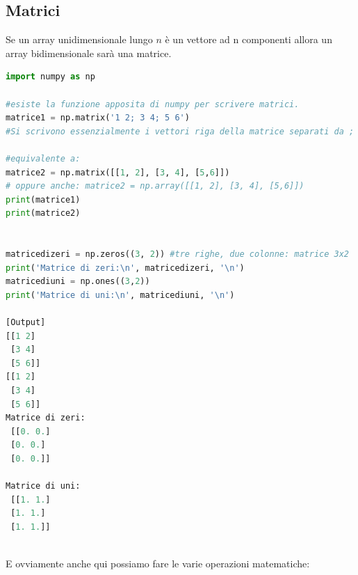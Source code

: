 \documentclass[10pt,a4paper]{article}
\begin{document}
\subsection{Matrici}
Se un array unidimensionale lungo $n$ è un vettore ad n componenti allora un array bidimensionale sarà una matrice.


\begin{lstlisting}[language=Python]
import numpy as np

#esiste la funzione apposita di numpy per scrivere matrici. 
matrice1 = np.matrix('1 2; 3 4; 5 6')   
#Si scrivono essenzialmente i vettori riga della matrice separati da ;

#equivalente a:
matrice2 = np.matrix([[1, 2], [3, 4], [5,6]])
# oppure anche: matrice2 = np.array([[1, 2], [3, 4], [5,6]])
print(matrice1)
print(matrice2)


matricedizeri = np.zeros((3, 2)) #tre righe, due colonne: matrice 3x2
print('Matrice di zeri:\n', matricedizeri, '\n')
matricediuni = np.ones((3,2))
print('Matrice di uni:\n', matricediuni, '\n')

[Output]
[[1 2]
 [3 4]
 [5 6]]
[[1 2]
 [3 4]
 [5 6]]
Matrice di zeri:
 [[0. 0.]
 [0. 0.]
 [0. 0.]] 

Matrice di uni:
 [[1. 1.]
 [1. 1.]
 [1. 1.]] 
 
\end{lstlisting}
E ovviamente anche qui possiamo fare le varie operazioni matematiche:
\end{document}
